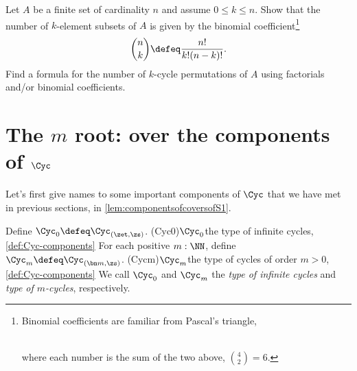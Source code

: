 \begin{xca}
  Let $A$ be a finite set of cardinality $n$ and assume $0\le k \le n$.
  Show that the number of $k$-element subsets of $A$ is given by the
  binomial coefficient\footnote{%
    Binomial coefficients are familiar from Pascal's triangle,\\
    \\
    \noindent where each number is the sum of the two above, \eg $\binom42 = 6$.}
  \[
    \binom nk \defeq \frac{n!}{k!(n-k)!}.
  \]
  Find a formula for the number of $k$-cycle permutations of $A$
  using factorials and/or binomial coefficients.
\end{xca}

\section{The \texorpdfstring{$m$\th}{mᵗʰ} root:
  \coverings over the components of $\Cyc$}

Let's first give names to some important components of $\Cyc$ that
we have met in previous sections, \eg in \cref{lem:componentsofcoversofS1}.

\begin{definition}\label{def:Cyc-components}
Define $\Cyc_0 \defeq \Cyc_{(\zet,\zs)}$.
\glossary(Cyc0){$\protect\Cyc_0$}{the type of infinite cycles,
\cref{def:Cyc-components}} 
For each positive $m:\NN$, define $\Cyc_m \defeq \Cyc_{(\bn m,\zs)}$.
\glossary(Cycm){$\protect\Cyc_m$}{the type of cycles of order $m>0$,
\cref{def:Cyc-components}} 
We call $\Cyc_0$ and $\Cyc_m$ the \emph{type of infinite cycles}
and \emph{type of $m$-cycles}, respectively.
\end{definition}

